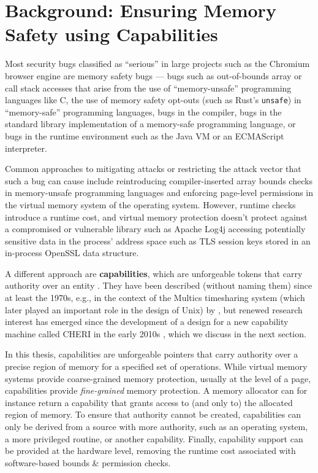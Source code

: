 \documentclass[main.tex]{subfiles}
\begin{document}
\onlyinsubfile{\mainmatter{}}

\chapter{Background: Ensuring Memory Safety using Capabilities} \label{ch:cheri}
Most security bugs classified as \enquote{serious} in large projects such as the Chromium browser engine are memory safety bugs \citep{chromium} — bugs such as out-of-bounds array or call stack accesses that arise from the use of \enquote{memory-unsafe} programming languages like C, the use of memory safety opt-outs (such as Rust’s \texttt{unsafe}) in \enquote{memory-safe} programming languages, bugs in the compiler, bugs in the standard library implementation of a memory-safe programming language, or bugs in the runtime environment such as the Java VM or an ECMAScript interpreter.

Common approaches to mitigating attacks or restricting the attack vector that such a bug can cause include reintroducing compiler-inserted array bounds checks in memory-unsafe programming languages and enforcing page-level permissions in the virtual memory system of the operating system. However, runtime checks introduce a runtime cost, and virtual memory protection doesn’t protect against a compromised or vulnerable library such as Apache Log4j accessing potentially sensitive data in the process’ address space such as TLS session keys stored in an in-process OpenSSL data structure.

A different approach are \textbf{capabilities}, which are unforgeable tokens that carry authority over an entity \citep[Section~1.1]{capsys}. They have been described (without naming them) since at least the 1970s, e.g., in the context of the Multics timesharing system (which later played an important role in the design of Unix) by \citet{multics}, but renewed research interest has emerged since the development of a design for a new capability machine called CHERI in the early 2010s \citep[Section~A.1, Chapter~13]{cheri}, which we discuss in the next section.

In this thesis, capabilities are unforgeable pointers that carry authority over a precise region of memory for a specified set of operations. While virtual memory systems provide coarse-grained memory protection, usually at the level of a page, capabilities provide \emph{fine-grained} memory protection. A memory allocator can for instance return a capability that grants access to (and only to) the allocated region of memory. To ensure that authority cannot be created, capabilities can only be derived from a source with more authority, such as an operating system, a more privileged routine, or another capability. Finally, capability support can be provided at the hardware level, removing the runtime cost associated with software-based bounds \& permission checks.
\end{document}
